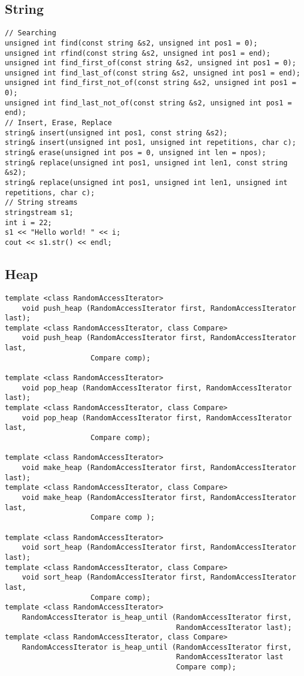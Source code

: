 \documentclass[a4paper]{article}
\begin{document}
\subsection{String}

\begin{verbatim}
// Searching
unsigned int find(const string &s2, unsigned int pos1 = 0);
unsigned int rfind(const string &s2, unsigned int pos1 = end);
unsigned int find_first_of(const string &s2, unsigned int pos1 = 0);
unsigned int find_last_of(const string &s2, unsigned int pos1 = end);
unsigned int find_first_not_of(const string &s2, unsigned int pos1 = 0);
unsigned int find_last_not_of(const string &s2, unsigned int pos1 = end);
// Insert, Erase, Replace
string& insert(unsigned int pos1, const string &s2);
string& insert(unsigned int pos1, unsigned int repetitions, char c);
string& erase(unsigned int pos = 0, unsigned int len = npos);
string& replace(unsigned int pos1, unsigned int len1, const string &s2);
string& replace(unsigned int pos1, unsigned int len1, unsigned int repetitions, char c);
// String streams
stringstream s1;
int i = 22;
s1 << "Hello world! " << i;
cout << s1.str() << endl;
\end{verbatim}

\subsection{Heap}

\begin{verbatim}
template <class RandomAccessIterator>
	void push_heap (RandomAccessIterator first, RandomAccessIterator last);
template <class RandomAccessIterator, class Compare>
	void push_heap (RandomAccessIterator first, RandomAccessIterator last,
					Compare comp);
					
template <class RandomAccessIterator>
	void pop_heap (RandomAccessIterator first, RandomAccessIterator last);
template <class RandomAccessIterator, class Compare>
	void pop_heap (RandomAccessIterator first, RandomAccessIterator last,
					Compare comp);
					
template <class RandomAccessIterator>
	void make_heap (RandomAccessIterator first, RandomAccessIterator last);
template <class RandomAccessIterator, class Compare>
	void make_heap (RandomAccessIterator first, RandomAccessIterator last,
					Compare comp );
					
template <class RandomAccessIterator>
	void sort_heap (RandomAccessIterator first, RandomAccessIterator last);
template <class RandomAccessIterator, class Compare>
	void sort_heap (RandomAccessIterator first, RandomAccessIterator last,
					Compare comp);
template <class RandomAccessIterator>
	RandomAccessIterator is_heap_until (RandomAccessIterator first,
										RandomAccessIterator last);
template <class RandomAccessIterator, class Compare>
	RandomAccessIterator is_heap_until (RandomAccessIterator first,
										RandomAccessIterator last
										Compare comp);
\end{verbatim}
\end{document}
